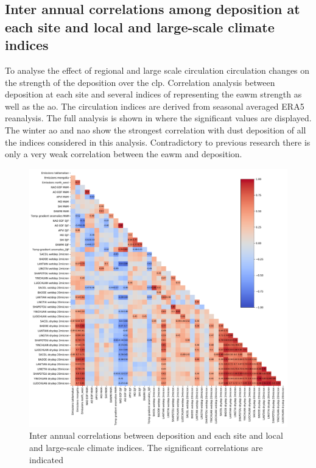 \subsection{Inter annual correlations among deposition at each site and local and large-scale climate indices}
To analyse the effect of regional and large scale circulation circulation changes on the strength of the deposition over the \acrshort{clp}. Correlation analysis between deposition at each site and several indices of representing the \acrshort{eawm} strength as well as the \acrshort{ao}. The circulation indices are derived from seasonal averaged ERA5 reanalysis. The full analysis is shown in  where the significant values are displayed. The winter \acrshort{ao} and \acrshort{nao} show the strongest correlation with dust deposition of all the indices considered in this analysis. Contradictory to previous research there is only a very weak correlation between the \acrshort{eawm} and deposition. 

\begin{figure}[htpb]
    \centering
    \includegraphics[width=\textwidth]{texfiles/figs/correlations.pdf}
    \caption{Inter annual correlations between deposition and each site and local and large-scale climate indices. The significant correlations are indicated}
    \label{fig:correlations}
\end{figure}

